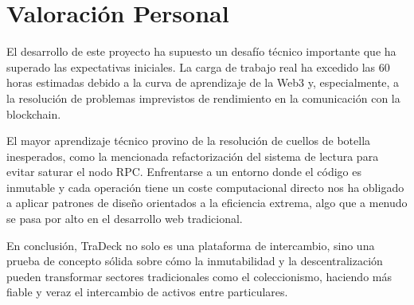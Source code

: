 \section{Valoración Personal}
El desarrollo de este proyecto ha supuesto un desafío técnico importante que ha superado las expectativas iniciales. La carga de trabajo real ha excedido las 60 horas estimadas debido a la curva de aprendizaje de la Web3 y, especialmente, a la resolución de problemas imprevistos de rendimiento en la comunicación con la blockchain. 

El mayor aprendizaje técnico provino de la resolución de cuellos de botella inesperados, como la mencionada refactorización 
del sistema de lectura para evitar saturar el nodo RPC. Enfrentarse a un entorno donde el código es inmutable y cada operación 
tiene un coste computacional directo nos ha obligado a aplicar patrones de diseño orientados a la eficiencia extrema, 
algo que a menudo se pasa por alto en el desarrollo web tradicional.

En conclusión, TraDeck no solo es una plataforma de intercambio, sino una prueba de concepto sólida sobre cómo la inmutabilidad y la descentralización pueden transformar sectores tradicionales como el coleccionismo, haciendo más fiable y veraz el intercambio de activos entre particulares.